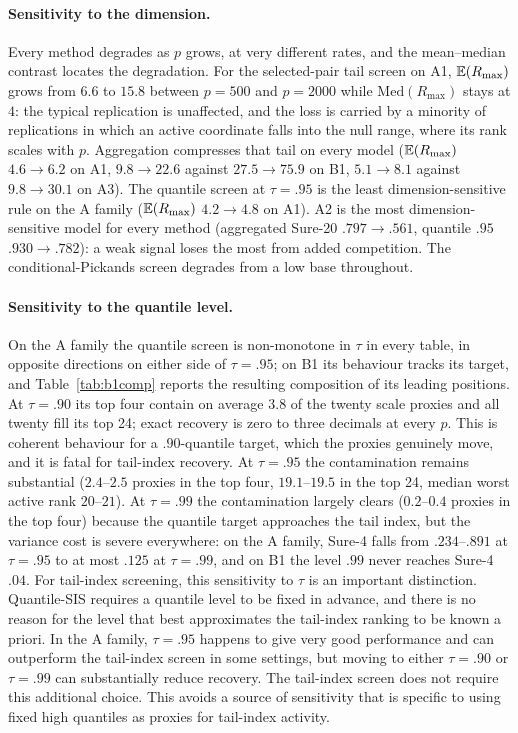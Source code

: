\paragraph{Sensitivity to the dimension.}
Every method degrades as $p$ grows, at very different rates, and the
mean--median contrast locates the degradation. For the selected-pair
tail screen on A1, $\mathbb E(R_{\max})$ grows from $6.6$ to $15.8$ between
$p=500$ and $p=2000$ while $\mathrm{Med}(R_{\max})$ stays at $4$: the
typical replication is unaffected, and the loss is carried by a
minority of replications in which an active coordinate falls into the
null range, where its rank scales with $p$. Aggregation compresses that
tail on every model ($\mathbb E(R_{\max})$ $4.6\to6.2$ on A1, $9.8\to22.6$
against $27.5\to75.9$ on B1, $5.1\to8.1$ against $9.8\to30.1$ on A3).
The quantile screen at $\tau=.95$ is the least dimension-sensitive rule
on the A family ($\mathbb E(R_{\max})$ $4.2\to4.8$ on A1). A2 is the most
dimension-sensitive model for every method (aggregated Sure-20
$.797\to.561$, quantile $.95$ $.930\to.782$): a weak signal loses the
most from added competition. The conditional-Pickands screen degrades
from a low base throughout.

\paragraph{Sensitivity to the quantile level.}
On the A family the quantile screen is non-monotone in $\tau$ in every
table, in opposite directions on either side of $\tau=.95$; on B1 its
behaviour tracks its target, and Table~\ref{tab:b1comp} reports the
resulting composition of its leading positions. At $\tau=.90$ its top
four contain on average $3.8$ of the twenty scale proxies and all
twenty fill its top 24; exact recovery is zero to three decimals at
every $p$. This is coherent behaviour for a $.90$-quantile target,
which the proxies genuinely move, and it is fatal for tail-index
recovery. At $\tau=.95$ the contamination remains substantial
($2.4$--$2.5$ proxies in the top four, $19.1$--$19.5$ in the top 24,
median worst active rank $20$--$21$). At $\tau=.99$ the contamination
largely clears ($0.2$--$0.4$ proxies in the top four) because the
quantile target approaches the tail index, but the variance cost is
severe everywhere: on the A family, Sure-4 falls from $.234$--$.891$
at $\tau=.95$ to at most $.125$ at $\tau=.99$, and on B1 the level
$.99$ never reaches Sure-4 $.04$. For tail-index screening, this sensitivity to $\tau$ is an important
distinction. Quantile-SIS requires a quantile level to be fixed in
advance, and there is no reason for the level that best approximates the
tail-index ranking to be known a priori. In the A family, $\tau=.95$
happens to give very good performance and can outperform the tail-index
screen in some settings, but moving to either $\tau=.90$ or $\tau=.99$
can substantially reduce recovery. The tail-index screen does not require
this additional choice. This avoids a
source of sensitivity that is specific to using fixed high quantiles as
proxies for tail-index activity.

